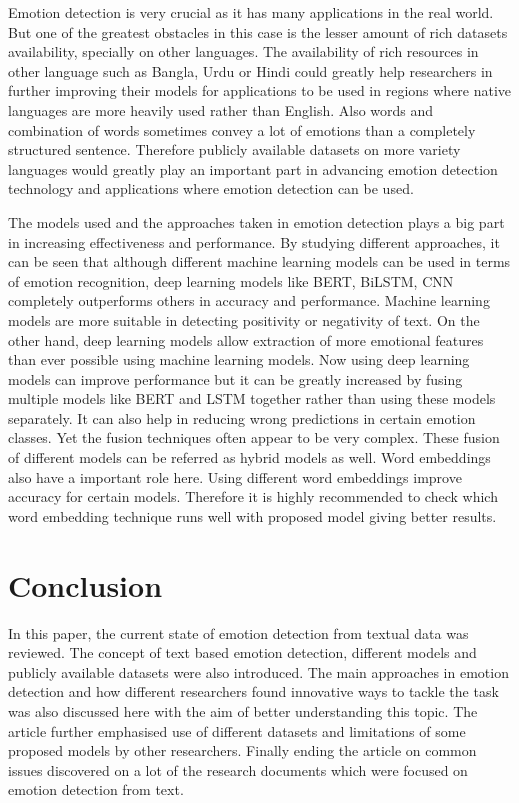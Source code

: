 \documentclass[runningheads]{llncs}
\begin{document}
Emotion detection is very crucial as it has many applications in the real world. But one of the greatest obstacles in this case is the lesser amount of rich datasets availability, specially on other languages. The availability of rich resources in other language such as Bangla, Urdu or Hindi could greatly help researchers in further improving their models for applications to be used in regions where native languages are more heavily used rather than English. Also words and combination of words sometimes convey a lot of emotions than a completely structured sentence. Therefore publicly available datasets on more variety languages would greatly play an important part in advancing emotion detection technology and applications where emotion detection can be used.  

The models used and the approaches taken in emotion detection plays a big part in increasing effectiveness and performance. By studying different approaches, it can be seen that although different machine learning models can be used in terms of emotion recognition, deep learning models like BERT, BiLSTM, CNN completely outperforms others in accuracy and performance. Machine learning models are more suitable in detecting positivity or negativity of text. On the other hand, deep learning models allow extraction of more emotional features than ever possible using machine learning models. Now using deep learning models can improve performance but it can be greatly increased by fusing multiple models like BERT and LSTM together rather than using these models separately. It can also help in reducing wrong predictions in certain emotion classes. Yet the fusion techniques often appear to be very complex. These fusion of different models can be referred as hybrid models as well. Word embeddings also have a important role here. Using different word embeddings improve accuracy for certain models. Therefore it is highly recommended to check which word embedding technique runs well with proposed model giving better results.


\section{Conclusion}
In this paper, the current state of emotion detection from textual data was reviewed. The concept of text based emotion detection, different models and publicly available datasets were also introduced. The main approaches in emotion detection and how different researchers found innovative ways to tackle the task was also discussed here with the aim of better understanding this topic. The article further emphasised use of different datasets and limitations of some proposed models by other researchers. Finally ending the article on common issues discovered on a lot of the research documents which were focused on emotion detection from text.
\end{document}
